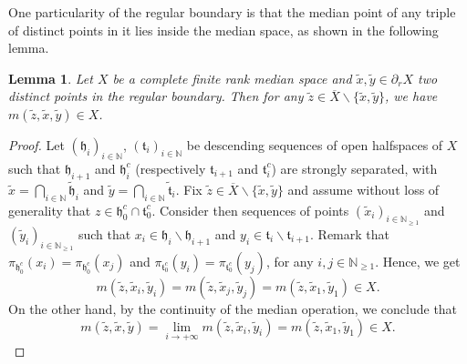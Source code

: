 \documentclass{amsart}
\numberwithin{equation}{section}
\newtheorem{lem}[thm]{Lemma}
\newcommand{\hh}{\mathfrak{h}}    %
\newcommand{\ttt}{\mathfrak{t}}   %
\newcommand{\NN}{\mathbb{N}}      %
\theoremstyle{definition}
\def\bar{\overline}
\begin{document}
One particularity of the regular boundary is that the median point of any triple of distinct points in it lies inside the median space, as shown in the following lemma. 
\begin{lem}\label{lem_interval_between_strongly_separated_ultrafilters}
Let $X$ be a complete finite rank median space and $\tilde{x},\tilde{y}\in\partial_r X$ two distinct points in the regular boundary. Then for any $\tilde{z}\in \bar{X}\backslash\{\tilde{x},\tilde{y}\}$, we have $m(\tilde{z},\tilde{x},\tilde{y})\in X$.
\end{lem}
\begin{proof}
    Let $(\hh_i)_{i\in\NN}$, $(\ttt_i)_{i\in\NN}$ be descending sequences of open halfspaces of $X$ such that $\hh_{i+1}$ and $\hh_{i}^c$ (respectively $\ttt_{i+1}$ and $\ttt_{i}^c$) are strongly separated, with $\displaystyle{\tilde{x}=\bigcap_{i\in\NN}\tilde{\hh}_i}$ and $\displaystyle{\tilde{y}=\bigcap_{i\in\NN}\tilde{\ttt}_i}$. Fix $\tilde{z}\in \bar{X}\backslash \{\tilde{x},\tilde{y}\}$ and assume without loss of generality that $z\in\hh_0^c\cap\ttt_0^c$. Consider then sequences of points $(\tilde{x}_i)_{i\in\NN_{\geq 1}}$ and $(\tilde{y}_i)_{i\in\NN_{\geq 1}}$ such that $x_i\in\hh_i\backslash\hh_{i+1}$ and $y_i\in\ttt_i\backslash\ttt_{i+1}$. Remark that $\pi_{\hh_0^c}(x_i)=\pi_{\hh_0^c}(x_j)$ and $\pi_{\ttt_0^c}(y_i)=\pi_{\ttt_0^c}(y_j)$, for any $i,j\in\NN_{\geq 1}$. Hence, we get
    \[
    m(\tilde{z},\tilde{x}_i,\tilde{y}_i)=m(\tilde{z},\tilde{x}_j,\tilde{y}_j)=m(\tilde{z},\tilde{x}_1,\tilde{y}_1)\in X.
    \]
    On the other hand, by the continuity of the median operation, we conclude that 
    \[
   m(\tilde{z},\tilde{x},\tilde{y}) = \lim_{i\rightarrow +\infty}  m(\tilde{z},\tilde{x}_i,\tilde{y}_i) = m(\tilde{z},\tilde{x}_1,\tilde{y}_1) \in X.
    \]
\end{proof}
\end{document}
